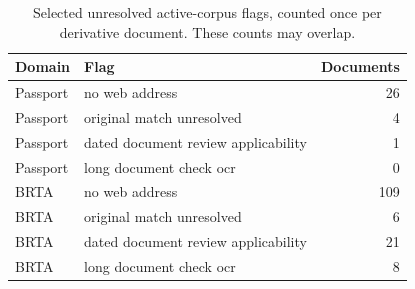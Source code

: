 \begin{table}[htbp]\centering\small
\caption{Selected unresolved active-corpus flags, counted once per derivative document. These counts may overlap.}
\begin{tabularx}{\linewidth}{p{20mm}Xr}\toprule
Domain & Flag & Documents\\\midrule
Passport & no web address & 26\\
Passport & original match unresolved & 4\\
Passport & dated document review applicability & 1\\
Passport & long document check ocr & 0\\
BRTA & no web address & 109\\
BRTA & original match unresolved & 6\\
BRTA & dated document review applicability & 21\\
BRTA & long document check ocr & 8\\
\bottomrule\end{tabularx}\end{table}
